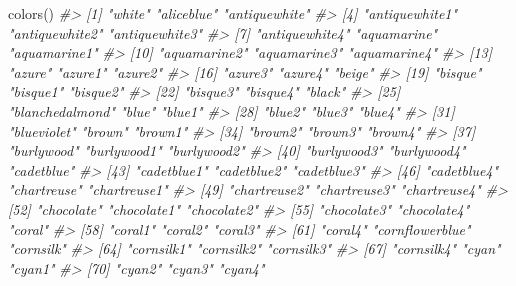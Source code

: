 \documentclass[
]{book}
\newenvironment{Shaded}{\begin{snugshade}}{\end{snugshade}}
\newcommand{\CommentTok}[1]{\textcolor[rgb]{0.56,0.35,0.01}{\textit{#1}}}
\newcommand{\FunctionTok}[1]{\textcolor[rgb]{0.00,0.00,0.00}{#1}}
\newcommand{\NormalTok}[1]{#1}
\begin{document}
\begin{Shaded}
\begin{Highlighting}[]
\FunctionTok{colors}\NormalTok{()}
\CommentTok{\#\textgreater{}   [1] "white"                "aliceblue"            "antiquewhite"        }
\CommentTok{\#\textgreater{}   [4] "antiquewhite1"        "antiquewhite2"        "antiquewhite3"       }
\CommentTok{\#\textgreater{}   [7] "antiquewhite4"        "aquamarine"           "aquamarine1"         }
\CommentTok{\#\textgreater{}  [10] "aquamarine2"          "aquamarine3"          "aquamarine4"         }
\CommentTok{\#\textgreater{}  [13] "azure"                "azure1"               "azure2"              }
\CommentTok{\#\textgreater{}  [16] "azure3"               "azure4"               "beige"               }
\CommentTok{\#\textgreater{}  [19] "bisque"               "bisque1"              "bisque2"             }
\CommentTok{\#\textgreater{}  [22] "bisque3"              "bisque4"              "black"               }
\CommentTok{\#\textgreater{}  [25] "blanchedalmond"       "blue"                 "blue1"               }
\CommentTok{\#\textgreater{}  [28] "blue2"                "blue3"                "blue4"               }
\CommentTok{\#\textgreater{}  [31] "blueviolet"           "brown"                "brown1"              }
\CommentTok{\#\textgreater{}  [34] "brown2"               "brown3"               "brown4"              }
\CommentTok{\#\textgreater{}  [37] "burlywood"            "burlywood1"           "burlywood2"          }
\CommentTok{\#\textgreater{}  [40] "burlywood3"           "burlywood4"           "cadetblue"           }
\CommentTok{\#\textgreater{}  [43] "cadetblue1"           "cadetblue2"           "cadetblue3"          }
\CommentTok{\#\textgreater{}  [46] "cadetblue4"           "chartreuse"           "chartreuse1"         }
\CommentTok{\#\textgreater{}  [49] "chartreuse2"          "chartreuse3"          "chartreuse4"         }
\CommentTok{\#\textgreater{}  [52] "chocolate"            "chocolate1"           "chocolate2"          }
\CommentTok{\#\textgreater{}  [55] "chocolate3"           "chocolate4"           "coral"               }
\CommentTok{\#\textgreater{}  [58] "coral1"               "coral2"               "coral3"              }
\CommentTok{\#\textgreater{}  [61] "coral4"               "cornflowerblue"       "cornsilk"            }
\CommentTok{\#\textgreater{}  [64] "cornsilk1"            "cornsilk2"            "cornsilk3"           }
\CommentTok{\#\textgreater{}  [67] "cornsilk4"            "cyan"                 "cyan1"               }
\CommentTok{\#\textgreater{}  [70] "cyan2"                "cyan3"                "cyan4"               }

\end{Highlighting}
\end{Shaded}
\end{document}
